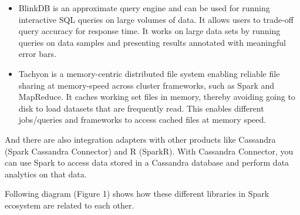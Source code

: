\documentclass[a4paper,12pt]{article}
\begin{document}
\begin{itemize}
\item BlinkDB is an approximate query engine and can be used for running interactive SQL queries on large volumes of data. It allows users to trade-off query accuracy for response time. It works on large data sets by running queries on data samples and presenting results annotated with meaningful error bars.

\item Tachyon is a memory-centric distributed file system enabling reliable file sharing at memory-speed across cluster frameworks, such as Spark and MapReduce. It caches working set files in memory, thereby avoiding going to disk to load datasets that are frequently read. This enables different jobs/queries and frameworks to access cached files at memory speed.
\end{itemize}
And there are also integration adapters with other products like Cassandra (Spark Cassandra Connector) and R (SparkR). With Cassandra Connector, you can use Spark to access data stored in a Cassandra database and perform data analytics on that data.

Following diagram (Figure 1) shows how these different libraries in Spark ecosystem are related to each other.
\end{document}
